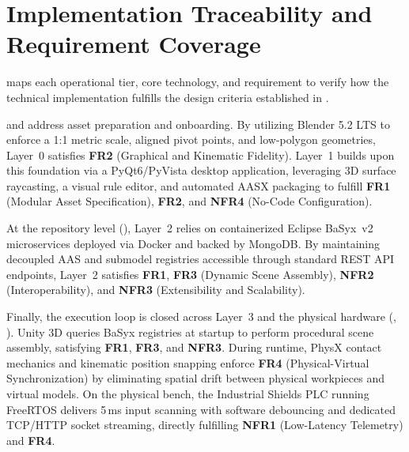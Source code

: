 \section{Implementation Traceability and Requirement Coverage}
\label{sec:impl_traceability}

 maps each operational tier, core technology, and requirement to verify how the technical implementation fulfills the design criteria established in .

 and  address asset preparation and onboarding. By utilizing Blender 5.2 LTS to enforce a 1:1 metric scale, aligned pivot points, and low-polygon geometries, Layer~0 satisfies \textbf{FR2} (Graphical and Kinematic Fidelity). Layer~1 builds upon this foundation via a PyQt6/PyVista desktop application, leveraging 3D surface raycasting, a visual rule editor, and automated \gls{AASX} packaging to fulfill \textbf{FR1} (Modular Asset Specification), \textbf{FR2}, and \textbf{NFR4} (No-Code Configuration).

At the repository level (), Layer~2 relies on containerized Eclipse BaSyx~v2 microservices deployed via Docker and backed by MongoDB. By maintaining decoupled \gls{AAS} and submodel registries accessible through standard \gls{REST} \gls{API} endpoints, Layer~2 satisfies \textbf{FR1}, \textbf{FR3} (Dynamic Scene Assembly), \textbf{NFR2} (Interoperability), and \textbf{NFR3} (Extensibility and Scalability). 

Finally, the execution loop is closed across Layer~3 and the physical hardware (, ). Unity 3D queries BaSyx registries at startup to perform procedural scene assembly, satisfying \textbf{FR1}, \textbf{FR3}, and \textbf{NFR3}. During runtime, PhysX contact mechanics and kinematic position snapping enforce \textbf{FR4} (Physical-Virtual Synchronization) by eliminating spatial drift between physical workpieces and virtual models. On the physical bench, the Industrial Shields \gls{PLC} running FreeRTOS delivers 5\,ms input scanning with software debouncing and dedicated \gls{TCP}/\gls{HTTP} socket streaming, directly fulfilling \textbf{NFR1} (Low-Latency Telemetry) and \textbf{FR4}.

